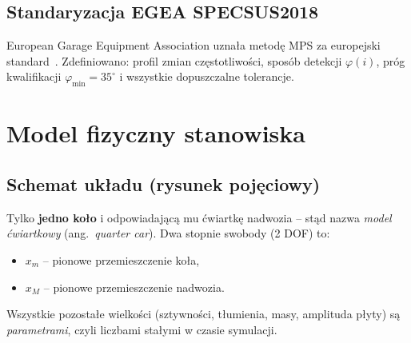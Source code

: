 \documentclass[11pt,a4paper]{article}
\theoremstyle{plainpol}
\begin{document}
\subsection{Standaryzacja EGEA SPECSUS2018}

European Garage Equipment Association uznała metodę MPS za europejski
standard~\cite{EGEA2019}. Zdefiniowano: profil zmian częstotliwości,
sposób detekcji $\varphi(i)$, próg kwalifikacji $\varphi_{\min} =
35^\circ$ i wszystkie dopuszczalne tolerancje.

\section{Model fizyczny stanowiska}\label{sec:model}

\subsection{Schemat układu (rysunek pojęciowy)}

\begin{center}
\end{center}

\begin{notatka}[title=Co modelujemy]
Tylko \textbf{jedno koło} i odpowiadającą mu ćwiartkę nadwozia -- stąd
nazwa \emph{model ćwiartkowy} (ang.~\emph{quarter car}). Dwa stopnie
swobody (2 DOF) to:
\begin{itemize}
  \item $x_m$ -- pionowe przemieszczenie koła,
  \item $x_M$ -- pionowe przemieszczenie nadwozia.
\end{itemize}
Wszystkie pozostałe wielkości (sztywności, tłumienia, masy, amplituda
płyty) są \emph{parametrami}, czyli liczbami stałymi w czasie symulacji.
\end{notatka}
\end{document}
